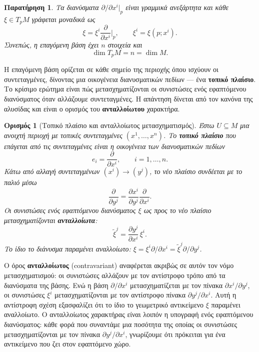 \documentclass[11pt,a4paper,twoside,openright]{book}
\newtheorem{remark}[lemma]{Παρατήρηση}
\newtheorem{definition}[lemma]{Ορισμός}
\begin{document}
\begin{remark}
Τα διανύσματα $\partial / \partial x^i|_p$ είναι γραμμικά ανεξάρτητα και κάθε $\xi \in T_pM$ γράφεται μοναδικά ως
\[
\xi = \xi^i \frac{\partial}{\partial x^i}\bigg|_p, \qquad \xi^i = \xi(p; x^i).
\]
Συνεπώς, η επαγόμενη βάση έχει $n$ στοιχεία και
\[
\dim T_pM = n = \dim M.
\]
\end{remark}

Η επαγόμενη βάση ορίζεται σε κάθε σημείο της περιοχής όπου ισχύουν οι συντεταγμένες, δίνοντας μια οικογένεια διανυσματικών πεδίων --- ένα \textbf{τοπικό πλαίσιο}. Το κρίσιμο ερώτημα είναι πώς μετασχηματίζονται οι συνιστώσες ενός εφαπτόμενου διανύσματος όταν αλλάζουμε συντεταγμένες. Η απάντηση δίνεται από τον κανόνα της αλυσίδας και είναι ο ορισμός του \textbf{ανταλλοίωτου} χαρακτήρα.

\begin{definition}[Τοπικό πλαίσιο και ανταλλοίωτος μετασχηματισμός]
Έστω $U \subseteq M$ μια ανοιχτή περιοχή με τοπικές συντεταγμένες $(x^1, \dots, x^n)$. Το \textbf{τοπικό πλαίσιο} που επάγεται από τις συντεταγμένες είναι η οικογένεια των διανυσματικών πεδίων
\begin{equation}
e_i = \frac{\partial}{\partial x^i}, \qquad i = 1, \dots, n.
\end{equation}
Κάτω από αλλαγή συντεταγμένων $(x^i) \to (y^j)$, το νέο πλαίσιο συνδέεται με το παλιό μέσω
\begin{equation}
\frac{\partial}{\partial y^j} = \frac{\partial x^i}{\partial y^j} \frac{\partial}{\partial x^i}.
\end{equation}
Οι συνιστώσες ενός εφαπτόμενου διανύσματος $\xi$ ως προς το νέο πλαίσιο μετασχηματίζονται \textbf{ανταλλοίωτα}:
\begin{equation}
\tilde{\xi}^j = \frac{\partial y^j}{\partial x^i} \, \xi^i.
\end{equation}
Το ίδιο το διάνυσμα παραμένει αναλλοίωτο: $\xi = \xi^i \partial / \partial x^i = \tilde{\xi}^j \partial / \partial y^j$.
\end{definition}

Ο όρος \textbf{ανταλλοίωτος} (contravariant) αναφέρεται ακριβώς σε αυτόν τον νόμο μετασχηματισμού: οι συνιστώσες αλλάζουν με τον αντίστροφο τρόπο από τα διανύσματα της βάσης. Ενώ η βάση $\partial / \partial x^i$ μετασχηματίζεται με τον πίνακα $\partial x^i / \partial y^j$, οι συνιστώσες $\xi^i$ μετασχηματίζονται με τον αντίστροφο πίνακα $\partial y^j / \partial x^i$. Αυτή η αντίστροφη σχέση εξασφαλίζει ότι το ίδιο το γεωμετρικό αντικείμενο $\xi$ παραμένει αναλλοίωτο. Ο ανταλλοίωτος χαρακτήρας είναι λοιπόν η υπογραφή ενός εφαπτόμενου διανύσματος: κάθε φορά που συναντάμε μια ποσότητα της οποίας οι συνιστώσες μετασχηματίζονται με τον πίνακα $\partial y^j / \partial x^i$, γνωρίζουμε ότι πρόκειται για ένα αντικείμενο που ζει στον εφαπτόμενο χώρο.
\end{document}
